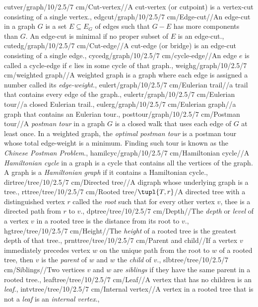 cutver/graph/10/2.5/7 cm/{Cut-vertex}/{}/{A cut-vertex (or cutpoint) is a vertex-cut consisting of a single vertex.},
edgcut/graph/10/2.5/7 cm/{Edge-cut}/{}/{An edge-cut in a graph $G$ is a set $E\subseteq E_G$ of edges such that $G-E$ has more components than $G$. An edge-cut is minimal if no proper subset of $E$ is an edge-cut.},
cutedg/graph/10/2.5/7 cm/{Cut-edge}/{}/{A cut-edge (or bridge) is an edge-cut consisting of a single edge.},
cycedg/graph/10/2.5/7 cm/{cycle-edge}/{}/{An edge $e$ is called a cycle-edge if $e$ lies in some cycle of that graph.},
weighg/graph/10/2.5/7 cm/{weighted graph}/{}/{A weighted graph is a graph where each edge is assigned a number called its \emph{edge-weight}.},
eulert/graph/10/2.5/7 cm/{Eulerian trail}/{}/{a trail that contains every edge of the graph.},
eulertr/graph/10/2.5/7 cm/{Eulerian tour}/{}/{a closed Eulerian trail.},
eulerg/graph/10/2.5/7 cm/{Eulerian graph}/{}/{a graph that contains an Eulerian tour.},
posttour/graph/10/2.5/7 cm/{Postman tour}/{}/{A \emph{postman tour} in a graph $G$ is a closed walk that uses each edge of $G$ at least once. In a weighted graph, the \emph{optimal postman tour} is a postman tour whose total edge-weight is a minimum. Finding such tour is known as the \emph{Chinese Postman Problem}.},
hamilcyc/graph/10/2.5/7 cm/{Hamiltonian cycle}/{}/{A \emph{Hamiltonian cycle} in a graph is a cycle that contains all the vertices of the graph. A graph is a \emph{Hamiltonian graph} if it contains a Hamiltonian cycle.},
dirtree/tree/10/2.5/7 cm/{Directed tree}/{}/{A digraph whose underlying graph is a tree.},
rttree/tree/10/2.5/7 cm/{Rooted tree}/{$\tupl{T,r}$}/{A directed tree with a distinguished vertex $r$ called the \emph{root} such that for every other vertex $v$, thee is a directed path from $r$ to $v$.},
dptree/tree/10/2.5/7 cm/{Depth}/{}/{The \emph{depth} or \emph{level} of a vertex $v$ in a rooted tree is the distance from its root to $v$.},
hgtree/tree/10/2.5/7 cm/{Height}/{}/{The \emph{height} of a rooted tree is the greatest depth of that tree.},
prnttree/tree/10/2.5/7 cm/{Parent and child}/{}/{If a vertex $v$ immediately precedes vertex $w$ on the unique path from the root to $w$ of a rooted tree, then $v$ is the \emph{parent} of $w$ and $w$ the \emph{child} of $v$.},
slbtree/tree/10/2.5/7 cm/{Siblings}/{}/{Two vertices $v$ and $w$ are \emph{siblings} if they have the same parent in a rooted tree.},
leaftree/tree/10/2.5/7 cm/{Leaf}/{}/{A vertex that has no children is an \emph{leaf}.},
intvtree/tree/10/2.5/7 cm/{Internal vertex}/{}/{A vertex in a rooted tree that is not a \emph{leaf} is an \emph{internal vertex}.},
